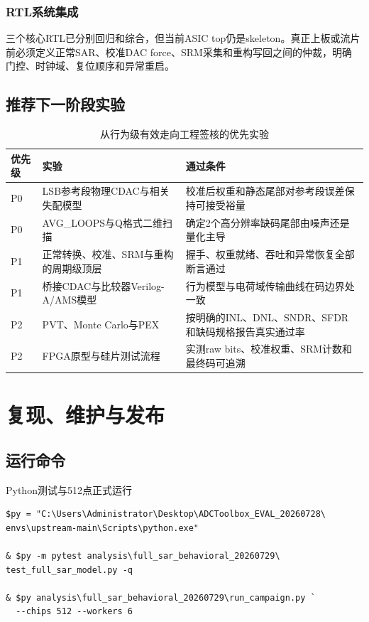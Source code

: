 \documentclass[11pt,a4paper,UTF8,fontset=none,openany]{ctexrep}
\numberwithin{equation}{chapter}
\numberwithin{figure}{chapter}
\numberwithin{table}{chapter}
\begin{document}
\subsection{RTL系统集成}

三个核心RTL已分别回归和综合，但当前ASIC top仍是skeleton。真正上板或流片
前必须定义正常SAR、校准DAC force、SRM采集和重构写回之间的仲裁，明确
门控、时钟域、复位顺序和异常重启。

\section{推荐下一阶段实验}

\begin{table}[htbp]
\centering
\caption{从行为级有效走向工程签核的优先实验}
\begin{tabularx}{\textwidth}{@{}
  >{\raggedright\arraybackslash}p{1.3cm}
  >{\raggedright\arraybackslash}p{4.6cm}
  >{\raggedright\arraybackslash}X@{}}
\toprule
优先级 & 实验 & 通过条件 \\
\midrule
P0 &
LSB参考段物理CDAC与相关失配模型 &
校准后权重和静态尾部对参考段误差保持可接受裕量 \\
P0 &
AVG\_LOOPS与Q格式二维扫描 &
确定2个高分辨率缺码尾部由噪声还是量化主导 \\
P1 &
正常转换、校准、SRM与重构的周期级顶层 &
握手、权重就绪、吞吐和异常恢复全部断言通过 \\
P1 &
桥接CDAC与比较器Verilog-A/AMS模型 &
行为模型与电荷域传输曲线在码边界处一致 \\
P2 &
PVT、Monte Carlo与PEX &
按明确的INL、DNL、SNDR、SFDR和缺码规格报告真实通过率 \\
P2 &
FPGA原型与硅片测试流程 &
实测raw bits、校准权重、SRM计数和最终码可追溯 \\
\bottomrule
\end{tabularx}
\end{table}

\chapter{复现、维护与发布}

\section{运行命令}

\begin{reproductionbox}{Python测试与512点正式运行}
\begin{Verbatim}[fontsize=\small,breaklines=true]
$py = "C:\Users\Administrator\Desktop\ADCToolbox_EVAL_20260728\
envs\upstream-main\Scripts\python.exe"

& $py -m pytest analysis\full_sar_behavioral_20260729\
test_full_sar_model.py -q

& $py analysis\full_sar_behavioral_20260729\run_campaign.py `
  --chips 512 --workers 6
\end{Verbatim}
\end{reproductionbox}
\end{document}
